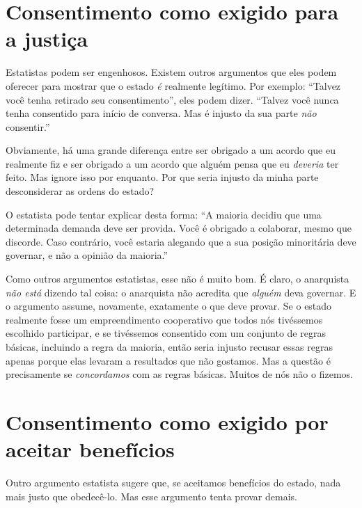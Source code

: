\section{Consentimento como exigido para a justiça}

Estatistas podem ser engenhosos. Existem outros argumentos que eles podem oferecer para mostrar que o estado \emph{é} realmente legítimo. Por exemplo: ``Talvez você tenha retirado seu consentimento'', eles podem dizer. ``Talvez você nunca tenha consentido para início de conversa. Mas é injusto da sua parte \emph{não} consentir.''

Obviamente, há uma grande diferença entre ser obrigado a um acordo que eu realmente fiz e ser obrigado a um acordo que alguém pensa que eu \emph{deveria} ter feito. Mas ignore isso por enquanto. Por que seria injusto da minha parte desconsiderar as ordens do estado?

O estatista pode tentar explicar desta forma: ``A maioria decidiu que uma determinada demanda deve ser provida. Você é obrigado a colaborar, mesmo que discorde. Caso contrário, você estaria alegando que a sua posição minoritária deve governar, e não a opinião da maioria.''

Como outros argumentos estatistas, esse não é muito bom. É claro, o anarquista \emph{não está} dizendo tal coisa: o anarquista não acredita que \emph{alguém} deva governar. E o argumento assume, novamente, exatamente o que deve provar. Se o estado realmente fosse um empreendimento cooperativo que todos nós tivéssemos escolhido participar, e se tivéssemos consentido com um conjunto de regras básicas, incluindo a regra da maioria, então seria injusto recusar essas regras apenas porque elas levaram a resultados que não gostamos. Mas a questão é precisamente se \emph{concordamos} com as regras básicas. Muitos de nós não o fizemos.

\section{Consentimento como exigido por aceitar benefícios}

Outro argumento estatista sugere que, se aceitamos benefícios do estado, nada mais justo que obedecê-lo. Mas esse argumento tenta provar demais.

